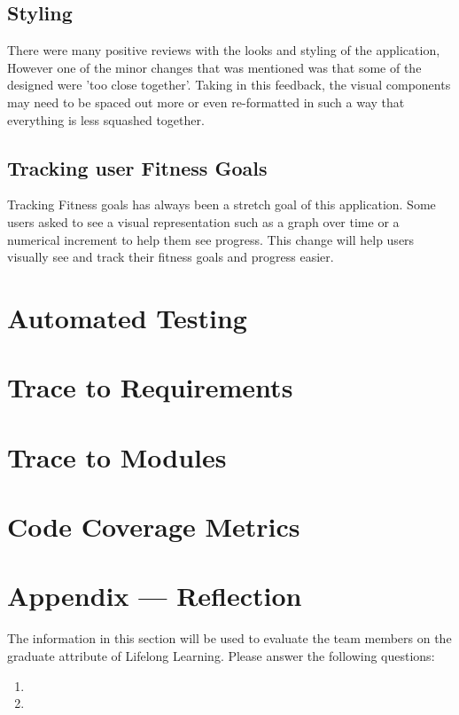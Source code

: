 \documentclass[12pt, titlepage]{article}
\begin{document}
\subsection{Styling}
There were many positive reviews with the looks and styling of the application, However one of the minor changes that was mentioned was that some of the designed were 'too close together'. Taking in this feedback, the visual components may need to be spaced out more or even re-formatted in such a way that everything is less squashed together.
\subsection{Tracking user Fitness Goals}
Tracking Fitness goals has always been a stretch goal of this application. Some users asked to see a visual representation such as a graph over time or a numerical increment to help them see progress. This change will help users visually see and track their fitness goals and progress easier.

\section{Automated Testing}
		
\section{Trace to Requirements}
		
\section{Trace to Modules}		

\section{Code Coverage Metrics}




\newpage{}
\section*{Appendix --- Reflection}

The information in this section will be used to evaluate the team members on the
graduate attribute of Lifelong Learning.  Please answer the following questions:

\begin{enumerate}
  \item 
  \item 
\end{enumerate}
\end{document}
